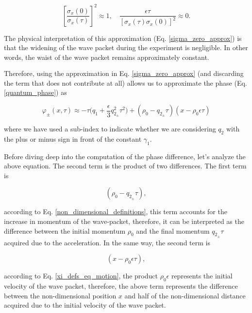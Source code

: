 \documentclass{article}
\begin{document}
\begin{equation}\label{sigma_quotient_approx}
\left[\frac{\sigma_{x}(0)}{\sigma_{x}(\tau)} \right]^{2} \approx 1 \mathrm{,}\quad \frac{\epsilon \tau}{ [\sigma_{x}(\tau)\sigma_{x}(0)]^{2}} \approx 0.
\end{equation}

The physical interpretation of this approximation (Eq. \ref{sigma_zero_approx}) is that the widening of the wave packet during the experiment is negligible. In other words, the waist of the wave packet remains approximately constant.

Therefore, using the approximation in Eq. \ref{sigma_zero_approx} (and discarding the term that does not contribute at all) allows us to approximate the phase (Eq. \ref{quantum_phase}) as

\begin{equation}\label{approx_quantum_phase}
\varphi_{\pm}(x, \tau) \approx -\tau \bigg(q_{1} + \frac{\epsilon}{3} q_{2_{\pm}}^{2} \tau^{2}\bigg) + (\rho_{0} - q_{2_{\pm}} \tau)(x-\rho_{0} \epsilon \tau)
\end{equation}

where we have used a sub-index to indicate whether we are considering $q_{2}$ with the plus or minus sign in front of the constant $\gamma_{1}$. 

Before diving deep into the computation of the phase difference, let's analyze the above equation. The second term is the product of two differences. The first term is 

\begin{equation}\label{momentum_change}
(\rho_{0} - q_{2_{\pm}} \tau),
\end{equation}

according to Eq. \ref{non_dimensional_definitions}, this term accounts for the increase in momentum of the wave-packet, therefore, it can be interpreted as the difference between the initial momentum $\rho_{0}$ and the final momentum $q_{2_{\pm}} \tau$ acquired due to the acceleration. In the same way, the second term is

\begin{equation}\label{position_change}
(x-\rho_{0} \epsilon \tau),
\end{equation}

according to Eq. \ref{xi_defs_eq_motion}, the product $\rho_{0} \epsilon$ represents the initial velocity of the wave packet, therefore, the above term represents the difference between the non-dimensional position $x$ and half of the non-dimensional distance acquired due to the initial velocity of the wave packet.
\end{document}
